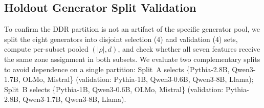 \subsection*{Holdout Generator Split Validation}
\label{app:holdout-split}

To confirm the DDR partition is not an artifact of the specific generator pool, we split the eight generators into disjoint selection (4) and validation (4) sets, compute per-subset pooled $(|\rho|, d)$, and check whether all seven features receive the same zone assignment in both subsets.
We evaluate two complementary splits to avoid dependence on a single partition:
Split~A selects \{Pythia-2.8B, Qwen3-1.7B, OLMo, Mistral\} (validation: Pythia-1B, Qwen3-0.6B, Qwen3-8B, Llama);
Split~B selects \{Pythia-1B, Qwen3-0.6B, OLMo, Mistral\} (validation: Pythia-2.8B, Qwen3-1.7B, Qwen3-8B, Llama).

\begin{table}[ht]
\centering
\small
\caption{Holdout split validation of the DDR partition. Selection (sel) and validation (val) $|\rho|$ and $d$ for two disjoint 4/4 generator splits. Zone assignment is identical across all four subsets for every feature.}
\label{tab:holdout-split}
\end{table}

